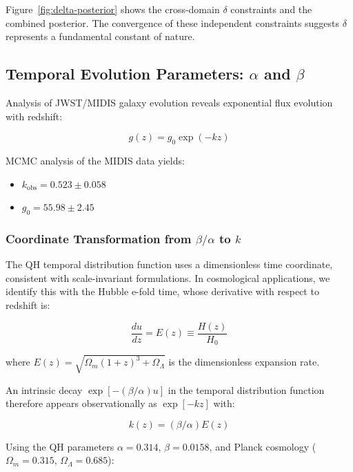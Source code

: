 Figure~\ref{fig:delta-posterior} shows the cross-domain $\delta$ constraints and the combined posterior. The convergence of these independent constraints suggests $\delta$ represents a fundamental constant of nature.

\subsection{Temporal Evolution Parameters: $\alpha$ and $\beta$}

Analysis of JWST/MIDIS galaxy evolution reveals exponential flux evolution with redshift:

\begin{equation}
g(z) = g_0 \exp(-kz)
\end{equation}

MCMC analysis of the MIDIS data yields:

\begin{itemize}
\item $k_{\text{obs}} = 0.523 \pm 0.058$
\item $g_0 = 55.98 \pm 2.45$
\end{itemize}

\subsubsection{Coordinate Transformation from $\beta/\alpha$ to $k$}

The QH temporal distribution function uses a dimensionless time coordinate, consistent with scale-invariant formulations. In cosmological applications, we identify this with the Hubble e-fold time, whose derivative with respect to redshift is:

\begin{equation}
\frac{du}{dz} = E(z) \equiv \frac{H(z)}{H_0}
\end{equation}

where $E(z) = \sqrt{\Omega_m(1+z)^3 + \Omega_\Lambda}$ is the dimensionless expansion rate.

An intrinsic decay $\exp[−(\beta/\alpha)u]$ in the temporal distribution function therefore appears observationally as $\exp[−kz]$ with:

\begin{equation}
k(z) = (\beta/\alpha)E(z)
\end{equation}

Using the QH parameters $\alpha = 0.314$, $\beta = 0.0158$, and Planck cosmology ($\Omega_m = 0.315$, $\Omega_\Lambda = 0.685$):

